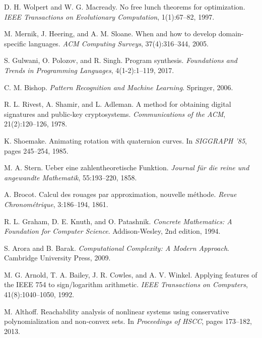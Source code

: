 \documentclass[11pt]{article}
\theoremstyle{definition}
\begin{document}
\begin{thebibliography}{99}
D. H. Wolpert and W. G. Macready.
\newblock No free lunch theorems for optimization.
\newblock \emph{IEEE Transactions on Evolutionary Computation}, 1(1):67--82, 1997.

M. Mernik, J. Heering, and A. M. Sloane.
\newblock When and how to develop domain-specific languages.
\newblock \emph{ACM Computing Surveys}, 37(4):316--344, 2005.

S. Gulwani, O. Polozov, and R. Singh.
\newblock Program synthesis.
\newblock \emph{Foundations and Trends in Programming Languages}, 4(1-2):1--119, 2017.

C. M. Bishop.
\newblock \emph{Pattern Recognition and Machine Learning}.
\newblock Springer, 2006.

R. L. Rivest, A. Shamir, and L. Adleman.
\newblock A method for obtaining digital signatures and public-key cryptosystems.
\newblock \emph{Communications of the ACM}, 21(2):120--126, 1978.

K. Shoemake.
\newblock Animating rotation with quaternion curves.
\newblock In \emph{SIGGRAPH '85}, pages 245--254, 1985.

M. A. Stern.
\newblock Ueber eine zahlentheoretische Funktion.
\newblock \emph{Journal f\"ur die reine und angewandte Mathematik}, 55:193--220, 1858.

A. Brocot.
\newblock Calcul des rouages par approximation, nouvelle m\'ethode.
\newblock \emph{Revue Chronom\'etrique}, 3:186--194, 1861.

R. L. Graham, D. E. Knuth, and O. Patashnik.
\newblock \emph{Concrete Mathematics: A Foundation for Computer Science}.
\newblock Addison-Wesley, 2nd edition, 1994.


S. Arora and B. Barak.
\newblock \emph{Computational Complexity: A Modern Approach}.
\newblock Cambridge University Press, 2009.

M. G. Arnold, T. A. Bailey, J. R. Cowles, and A. V. Winkel.
\newblock Applying features of the {IEEE} 754 to sign/logarithm arithmetic.
\newblock \emph{IEEE Transactions on Computers}, 41(8):1040--1050, 1992.

M. Althoff.
\newblock Reachability analysis of nonlinear systems using conservative polynomialization and non-convex sets.
\newblock In \emph{Proceedings of HSCC}, pages 173--182, 2013.


\end{thebibliography}
\end{document}
